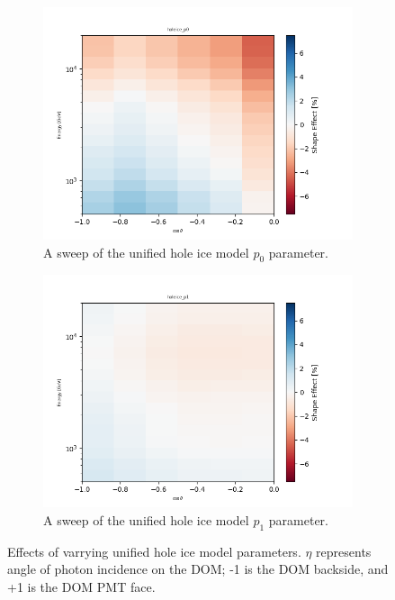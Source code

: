 \documentclass[main.tex]{subfiles}
\begin{document}
\begin{figure}
    \centering
    \begin{subfigure}{.45\textwidth}
        \centering
        \includegraphics[width=0.95\linewidth]{./figures/holeice_p0.png}
        \caption{A sweep of the unified hole ice model $p_0$ parameter.}
    \end{subfigure}%
    \begin{subfigure}{.45\textwidth}
        \centering
        \includegraphics[width=0.95\linewidth]{./figures/holeice_p1.png}
        \caption{A sweep of the unified hole ice model $p_1$ parameter.}
    \end{subfigure}
    \caption{Effects of varrying unified hole ice model parameters. $\eta$ represents angle of photon incidence on the DOM; -1 is the DOM backside, and +1 is the DOM PMT face.}\label{fig:holeiceparmas}
\end{figure}
\end{document}
